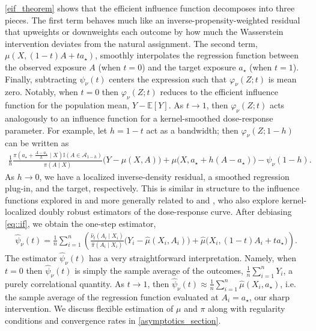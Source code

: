 \documentclass[11pt,twoside]{article}
\theoremstyle{definition}
\theoremstyle{remark}
\begin{document}
\cref{eif_theorem} shows that the efficient influence function decomposes into three pieces. The first term behaves much like an inverse-propensity-weighted residual that upweights or downweights each outcome by how much the Wasserstein intervention deviates from the natural assignment. The second term, $\mu(X, (1 - t)A + t a_{\star})$, smoothly interpolates the regression function between the observed exposure $A$ (when $t = 0$) and the target exposure $a_{\star}$ (when $t = 1$). Finally, subtracting $\psi_\nu(t)$ centers the expression such that $\varphi_\nu(Z; t)$ is mean zero. Notably, when $t = 0$ then $\varphi_\nu(Z; t)$ reduces to the efficient influence function for the population mean, $Y - \mathbb{E}[Y]$. As $t \to 1$, then $\varphi_\nu(Z; t)$ acts analogously to an influence function for a kernel-smoothed dose-response parameter. For example, let $h = 1 - t$ act as a bandwidth; then $\varphi_\nu(Z; 1 - h)$ can be written as
\begin{align} \label{bandwidth_framing}
    \frac{1}{h} \frac{\pi\left(a_\star + \frac{A - a_\star}{h} \mid X \right)\mathbb{I}(A \in \mathcal{A}_{1 - h})}{\pi(A \mid X)} \big(Y - \mu(X, A) \big) +  \mu\big(X, a_\star + h(A - a_\star)\big) - \psi_\nu(1-h).
\end{align}
As $h \to 0$, we have a localized inverse-density residual, a smoothed regression plug-in, and the target, respectively. This is similar in structure to the influence functions explored in \cite{bibaut2017dataadaptivesmoothingoptimalrateestimation} and more generally related to \cite{kennedy2017cte} and \cite{Colangelo02012026}, who also explore kernel-localized doubly robust estimators of the dose-response curve. After debiasing \cref{eq::if}, we obtain the one-step estimator,
\begin{align*}
    \widehat{\psi}_\nu(t) = \frac{1}{n} \sum^n_{i=1}\left(\frac{\widehat{\nu}_t(A_i \mid X_i)}{\widehat{\pi}(A_i \mid X_i)}\Big(Y_i - \widehat{\mu}(X_i, A_i) \Big) +  \widehat{\mu}\big(X_i, (1-t)A_i + ta_{\star}\big) \right).
\end{align*}
The estimator $\widehat{\psi}_\nu(t)$ has a very straightforward interpretation. Namely, when $t = 0$ then $\widehat{\psi}_\nu(t)$ is simply the sample average of the outcomes, $\frac{1}{n} \sum^n_{i=1} Y_i$, a purely correlational quantity. As $t \to 1$, then $\widehat{\psi}_\nu(t) \approx \frac{1}{n} \sum^n_{i=1} \widehat{\mu}(X_i, a_{\star})$, i.e. the sample average of the regression function evaluated at $A_i = a_{\star}$, our sharp intervention. We discuss flexible estimation of $\mu$ and $\pi$ along with regularity conditions and convergence rates in \cref{asymptotics_section}.
\end{document}
